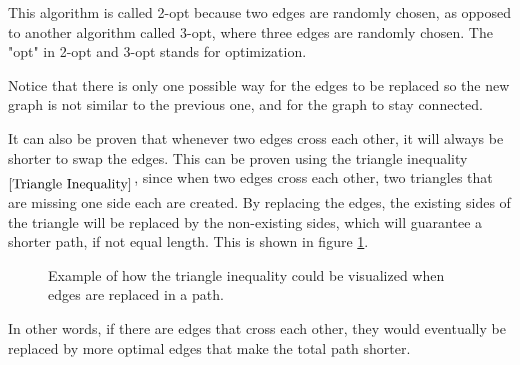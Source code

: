 \documentclass{article}
\begin{document}
\noindent
This algorithm is called 2-opt because two edges are randomly chosen, as opposed to another algorithm called 3-opt, where three edges are randomly chosen. The "opt" in 2-opt and 3-opt stands for optimization. 

\noindent
Notice that there is only one possible way for the edges to be replaced so the new graph is not similar to the previous one, and for the graph to stay connected.


\noindent
It can also be proven that whenever two edges cross each other, it will always be shorter to swap the edges. This can be proven using the triangle inequality$_{\ref{Triangle Inequality}}$, since when two edges cross each other, two triangles that are missing one side each are created. By replacing the edges, the existing sides of the triangle will be replaced by the non-existing sides, which will guarantee a shorter path, if not equal length. This is shown in figure \ref{Figure:triangleIneq2opt}.

\begin{figure}[ht]
     \centering
     \caption{Example of how the triangle inequality could be visualized when edges are replaced in a path.}
     \label{Figure:triangleIneq2opt}
\end{figure}

\noindent
In other words, if there are edges that cross each other, they would eventually be replaced by more optimal edges that make the total path shorter.
\end{document}
